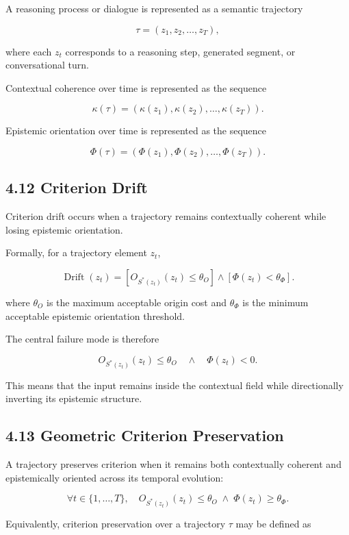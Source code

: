 \documentclass[11pt]{article}
\begin{document}
A reasoning process or dialogue is represented as a semantic trajectory

$$
\tau
=
(z_1,z_2,\dots,z_T),
$$

where each $z_t$ corresponds to a reasoning step, generated segment, or conversational turn.

Contextual coherence over time is represented as the sequence

$$
\kappa(\tau)
=
\left(\kappa(z_1),\kappa(z_2),\dots,\kappa(z_T)\right).
$$

Epistemic orientation over time is represented as the sequence

$$
\Phi(\tau)
=
\left(\Phi(z_1),\Phi(z_2),\dots,\Phi(z_T)\right).
$$

\subsection{4.12 Criterion Drift}

Criterion drift occurs when a trajectory remains contextually coherent while losing epistemic orientation.

Formally, for a trajectory element $z_t$,

$$
\operatorname{Drift}(z_t)
=
\left[
O_{S^{*}(z_t)}(z_t)\leq\theta_O
\right]
\wedge
\left[
\Phi(z_t)<\theta_\Phi
\right].
$$

where $\theta_O$ is the maximum acceptable origin cost and $\theta_\Phi$ is the minimum acceptable epistemic orientation threshold.

The central failure mode is therefore

$$
O_{S^{*}(z_t)}(z_t)\leq\theta_O
\quad\wedge\quad
\Phi(z_t)<0.
$$

This means that the input remains inside the contextual field while directionally inverting its epistemic structure.

\subsection{4.13 Geometric Criterion Preservation}

A trajectory preserves criterion when it remains both contextually coherent and epistemically oriented across its temporal evolution:

$$
\forall t\in\{1,\dots,T\},\quad
O_{S^{*}(z_t)}(z_t)\leq\theta_O
\;\wedge\;
\Phi(z_t)\geq\theta_\Phi.
$$

Equivalently, criterion preservation over a trajectory $\tau$ may be defined as
\end{document}
